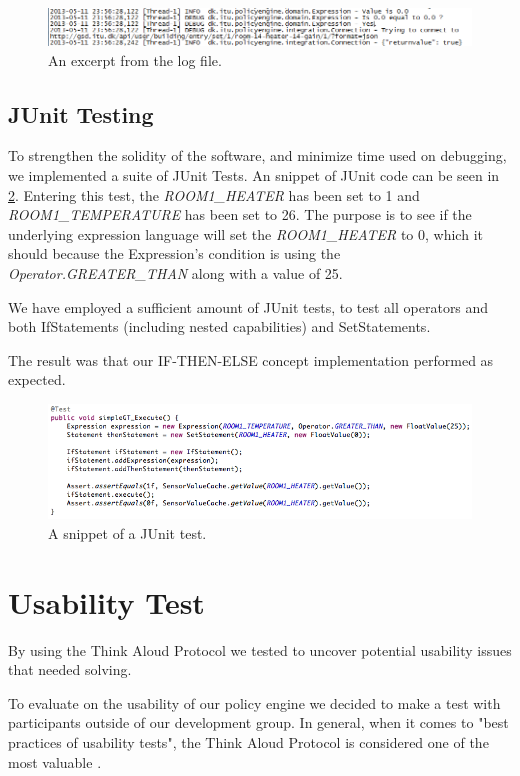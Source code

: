 \begin{figure}[ht]
\centering
\includegraphics[width=\columnwidth]{images/logoutput.png}
\caption{An excerpt from the log file.}
\label{fig:log}
\end{figure}

\subsection{JUnit Testing}
To strengthen the solidity of the software, and minimize time used on debugging, we implemented a suite of JUnit Tests. An snippet of JUnit code can be seen in \ref{fig:junit-example}. Entering this test, the \textit{ROOM1\_HEATER} has been set to 1 and \textit{ROOM1\_TEMPERATURE} has been set to 26. The purpose is to see if the underlying expression language will set the \textit{ROOM1\_HEATER} to 0, which it should because the Expression's condition is using the \textit{Operator.GREATER\_THAN} along with a value of 25.
 
We have employed a sufficient amount of JUnit tests, to test all operators and both IfStatements (including nested capabilities) and SetStatements.

The result was that our IF-THEN-ELSE concept implementation performed as expected.

\begin{figure}[ht]
\centering
\includegraphics[scale=.5]{images/junit-example.png}
\caption{A snippet of a JUnit test.}
\label{fig:junit-example}
\end{figure}

\section{Usability Test}\label{sec:usability-test}
By using the Think Aloud Protocol we tested to uncover potential usability issues that needed solving.

To evaluate on the usability of our policy engine we decided to make a test with participants outside of our development group. In general, when it comes to "best practices of usability tests", the Think Aloud Protocol is considered one of the most valuable \cite{Nielsen1993}.

